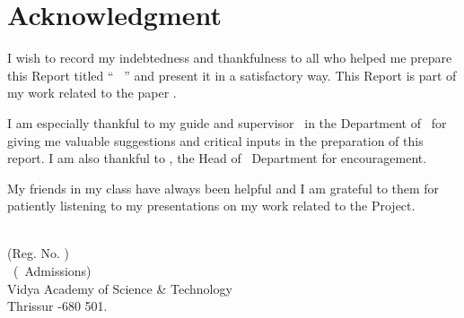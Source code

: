 %
\chapter*{Acknowledgment}
%
I wish to record my indebtedness and thankfulness 
to all who helped me prepare this Report titled 
`` \vtitle\ ''  and present it in a satisfactory way. This Report is part of my work related to the paper \vpaper.

I am especially thankful to my
guide and supervisor \vguide\  in the Department of \vdept\  
for giving me valuable suggestions and 
critical inputs in the preparation of this report. 
I am also thankful to \vhod, 
the Head of \vdept\  Department
for encouragement. 

My friends in my class have always been 
helpful and I am grateful to them for 
patiently listening to my presentations on my work related to the Project. 

\begin{flushright}
\vauthora\\ {\footnotesize (Reg. No. \vregisternumbera)}\\
\vclass\  (\vadmissionyear\  Admissions)\\
Vidya Academy of Science \& Technology\\
Thrissur -680 501.
\end{flushright}